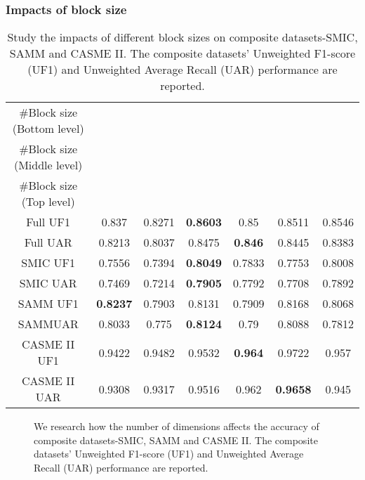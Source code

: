 \documentclass[review,12pt, 3p]{elsarticle}
\begin{document}
\subsubsection{Impacts of block size}
\begin{table*}[t]
\centering
\caption{ Study the impacts of different block sizes on composite datasets-SMIC, SAMM and CASME II. The composite datasets' Unweighted F1-score (UF1) and Unweighted Average Recall (UAR) performance are reported. }
\begin{tabular}{c| c c c c c c    }
\hline
\#Block size (Bottom level) & & & & & &  \\
\#Block size (Middle level) & & & & & &  \\
\#Block size (Top level) & & & & & &  \\
\hline
Full UF1   &0.837 &0.8271  & \textbf{0.8603}   & 0.85 & 0.8511 & 0.8546\\
Full UAR  &0.8213 &0.8037  & 0.8475  & \textbf{0.846}   & 0.8445 & 0.8383 \\
SMIC UF1   &0.7556 &0.7394  & \textbf{0.8049}   & 0.7833 & 0.7753 & 0.8008\\
SMIC UAR  &0.7469 &0.7214  & \textbf{0.7905}  & 0.7792   & 0.7708 & 0.7892 \\
SAMM UF1   &\textbf{0.8237} &0.7903  & 0.8131   & 0.7909 & 0.8168 & 0.8068\\
SAMMUAR  &0.8033 &0.775  & \textbf{0.8124}  & 0.79   & 0.8088 & 0.7812 \\
CASME II UF1   &0.9422 &0.9482  & 0.9532   & \textbf{0.964} & 0.9722 & 0.957\\
CASME II UAR  &0.9308 &0.9317  & 0.9516  & 0.962   & \textbf{0.9658} & 0.945 \\
\hline
\hline
\end{tabular}
 \label{impacts_of_block_size}
\end{table*}

 \begin{figure}[!t]
\centering
{}
\caption{We research how the number of dimensions affects the accuracy of composite datasets-SMIC, SAMM and CASME II. The composite datasets' Unweighted F1-score (UF1) and Unweighted Average Recall (UAR) performance are reported.}
\label{dimension_number}
\end{figure}
\end{document}
